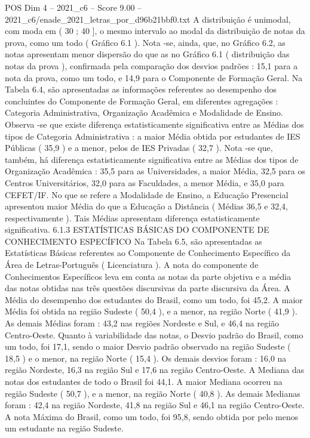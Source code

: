 \begin{textsample}{POS Dim 4 – 2021\_c6 – Score 9.00 – 2021\_c6/enade\_2021\_letras\_por\_d96b21bbf0.txt}
A distribuição é unimodal, com moda em ( 30 ; 40 ], o mesmo intervalo ao modal da distribuição de notas da prova, como um todo ( Gráfico 6.1 ).
Nota -se, ainda, que, no Gráfico 6.2, as notas apresentam menor dispersão do que as no Gráfico 6.1 ( distribuição das notas da prova ), confirmada pela comparação dos desvios padrões : 15,1 para a nota da prova, como um todo, e 14,9 para o Componente de Formação Geral.
Na Tabela 6.4, são apresentadas as informações referentes ao desempenho dos concluintes do Componente de Formação Geral, em diferentes agregações : Categoria Administrativa, Organização Acadêmica e Modalidade de Ensino.
Observa -se que existe diferença estatisticamente significativa entre as Médias dos tipos de Categoria Administrativa : a maior Média obtida por estudantes de IES Públicas ( 35,9 ) e a menor, pelos de IES Privadas ( 32,7 ).
Nota -se que, também, há diferença estatisticamente significativa entre as Médias dos tipos de Organização Acadêmica : 35,5 para as Universidades, a maior Média, 32,5 para os Centros Universitários, 32,0 para as Faculdades, a menor Média, e 35,0 para CEFET/IF.
No que se refere a Modalidade de Ensino, a Educação Presencial apresentou maior Média do que a Educação a Distância ( Médias 36,5 e 32,4, respectivamente ).
Tais Médias apresentam diferença estatisticamente significativa. 6.1.3 ESTATÍSTICAS BÁSICAS DO COMPONENTE DE CONHECIMENTO ESPECÍFICO Na Tabela 6.5, são apresentadas as Estatísticas Básicas referentes ao Componente de Conhecimento Específico da Área de Letras-Português ( Licenciatura ).
A nota do componente de Conhecimentos Específicos leva em conta as notas da parte objetiva e a média das notas obtidas nas três questões discursivas da parte discursiva da Área.
A Média do desempenho dos estudantes do Brasil, como um todo, foi 45,2.
A maior Média foi obtida na região Sudeste ( 50,4 ), e a menor, na região Norte ( 41,9 ).
As demais Médias foram : 43,2 nas regiões Nordeste e Sul, e 46,4 na região Centro-Oeste.
Quanto à variabilidade das notas, o Desvio padrão do Brasil, como um todo, foi 17,1, sendo o maior Desvio padrão observado na região Sudeste ( 18,5 ) e o menor, na região Norte ( 15,4 ).
Os demais desvios foram : 16,0 na região Nordeste, 16,3 na região Sul e 17,6 na região Centro-Oeste.
A Mediana das notas dos estudantes de todo o Brasil foi 44,1.
A maior Mediana ocorreu na região Sudeste ( 50,7 ), e a menor, na região Norte ( 40,8 ).
As demais Medianas foram : 42,4 na região Nordeste, 41,8 na região Sul e 46,1 na região Centro-Oeste.
A nota Máxima do Brasil, como um todo, foi 95,8, sendo obtida por pelo menos um estudante na região Sudeste.

\end{textsample}
